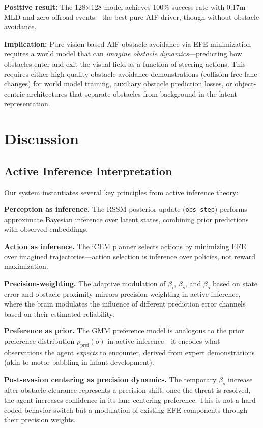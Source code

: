 \documentclass[conference]{IEEEtran}
\begin{document}
\textbf{Positive result:} The 128$\times$128 model achieves
100\% success rate with 0.17m MLD and zero offroad events---the best
pure-AIF driver, though without obstacle avoidance.

\textbf{Implication:} Pure vision-based AIF obstacle avoidance via
EFE minimization requires a world model that can \emph{imagine
obstacle dynamics}---predicting how obstacles enter and exit the
visual field as a function of steering actions. This requires either
high-quality obstacle avoidance demonstrations (collision-free lane
changes) for world model training, auxiliary obstacle prediction
losses, or object-centric architectures that separate obstacles from
background in the latent representation.

\section{Discussion}
\label{sec:discussion}

\subsection{Active Inference Interpretation}

Our system instantiates several key principles from active inference theory:

\textbf{Perception as inference.} The RSSM posterior update (\texttt{obs\_step}) performs approximate Bayesian inference over latent states, combining prior predictions with observed embeddings.

\textbf{Action as inference.} The iCEM planner selects actions by minimizing EFE over imagined trajectories---action selection is inference over policies, not reward maximization.

\textbf{Precision-weighting.} The adaptive modulation of $\beta_i$, $\beta_s$, and $\beta_o$ based on state error and obstacle proximity mirrors precision-weighting in active inference, where the brain modulates the influence of different prediction error channels based on their estimated reliability.

\textbf{Preference as prior.} The GMM preference model is analogous to the prior preference distribution $p_{\text{pref}}(o)$ in active inference---it encodes what observations the agent \emph{expects} to encounter, derived from expert demonstrations (akin to motor babbling in infant development).

\textbf{Post-evasion centering as precision dynamics.} The temporary $\beta_s$ increase after obstacle clearance represents a precision shift: once the threat is resolved, the agent increases confidence in its lane-centering preference. This is not a hard-coded behavior switch but a modulation of existing EFE components through their precision weights.
\end{document}
